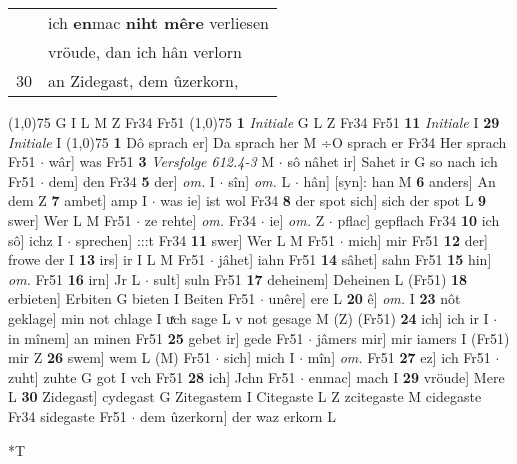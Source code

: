 \documentclass[8pt,a4paper,notitlepage]{article}
\begin{document}
\begin{table}[ht]
\begin{minipage}[t]{0.5\linewidth}
\begin{tabular}{rl}
 & ich \textbf{en}mac \textbf{niht mêre} verliesen\\ 
 & vröude, dan ich hân verlorn\\ 
30 & an Zidegast, dem ûzerkorn,\\ 
\end{tabular}
\scriptsize
\line(1,0){75} \newline
G I L M Z Fr34 Fr51 \newline
\line(1,0){75} \newline
\textbf{1} \textit{Initiale} G L Z Fr34 Fr51  \textbf{11} \textit{Initiale} I  \textbf{29} \textit{Initiale} I  \newline
\line(1,0){75} \newline
\textbf{1} Dô sprach er] Da sprach her M ÷O sprach er Fr34 Her sprach Fr51  $\cdot$ wâr] was Fr51 \textbf{3} \textit{Versfolge 612.4-3} M   $\cdot$ sô nâhet ir] Sahet ir G so nach ich Fr51  $\cdot$ dem] den Fr34 \textbf{5} der] \textit{om.} I  $\cdot$ sîn] \textit{om.} L  $\cdot$ hân] [syn]: han M \textbf{6} anders] An dem Z \textbf{7} ambet] amp I  $\cdot$ was ie] ist wol Fr34 \textbf{8} der spot sich] sich der spot L \textbf{9} swer] Wer L M Fr51  $\cdot$ ze rehte] \textit{om.} Fr34  $\cdot$ ie] \textit{om.} Z  $\cdot$ pflac] gepflach Fr34 \textbf{10} ich sô] ichz I  $\cdot$ sprechen] :::t Fr34 \textbf{11} swer] Wer L M Fr51  $\cdot$ mich] mir Fr51 \textbf{12} der] frowe der I \textbf{13} irs] ir I L M Fr51  $\cdot$ jâhet] iahn Fr51 \textbf{14} sâhet] sahn Fr51 \textbf{15} hin] \textit{om.} Fr51 \textbf{16} irn] Jr L  $\cdot$ sult] suln Fr51 \textbf{17} deheinem] Deheinen L (Fr51) \textbf{18} erbieten] Erbiten G bieten I Beiten Fr51  $\cdot$ unêre] ere L \textbf{20} ê] \textit{om.} I \textbf{23} nôt geklage] min not chlage I uͯch sage L v not gesage M (Z) (Fr51) \textbf{24} ich] ich ir I  $\cdot$ in mînem] an minen Fr51 \textbf{25} gebet ir] gede Fr51  $\cdot$ jâmers mir] mir iamers I (Fr51) mir Z \textbf{26} swem] wem L (M) Fr51  $\cdot$ sich] mich I  $\cdot$ mîn] \textit{om.} Fr51 \textbf{27} ez] ich Fr51  $\cdot$ zuht] zuhte G got I vch Fr51 \textbf{28} ich] Jchn Fr51  $\cdot$ enmac] mach I \textbf{29} vröude] Mere L \textbf{30} Zidegast] cydegast G Zitegastem I Citegaste L Z zcitegaste M cidegaste Fr34 sidegaste Fr51  $\cdot$ dem ûzerkorn] der waz erkorn L \newline
\end{minipage}
\hspace{0.5cm}
\begin{minipage}[t]{0.5\linewidth}
\small
\begin{center}*T

\end{center}
\end{minipage}
\end{table}
\end{document}
